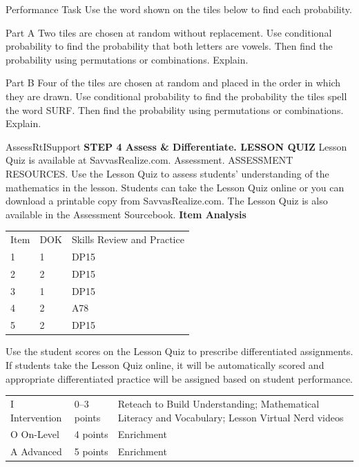 \documentclass{article}
\newenvironment{practice}[2]{}{}        %
\newenvironment{te-addendum}[2]{}{}     %
\newcommand{\answer}[1]{}               %
\newcommand{\placeholder}[2]{}          %
\begin{document}
\begin{practice}{36}{3}
Performance Task Use the word shown on the tiles below to find each probability.
\placeholder{diagram}{Nine equal red rectangular tiles with black outlines, white letters S U R F B O A R D in a horizontal row.}
Part A Two tiles are chosen at random without replacement. Use conditional probability to find the probability that both letters are vowels. Then find the probability using permutations or combinations. Explain.
\answer{Part A (P(V1\text{ and }V2)=P(V1)\cdot P(V2\mid V1)=\frac39\cdot\frac28=\frac1{12}); (P(V1\text{ and }V2)=\frac{{}_3C_2}{{}_9C_2}=\frac1{12})}
Part B Four of the tiles are chosen at random and placed in the order in which they are drawn. Use conditional probability to find the probability the tiles spell the word SURF. Then find the probability using permutations or combinations. Explain.
\answer{Part B (P(SURF)=\frac19\cdot\frac18\cdot\frac27\cdot\frac16=\frac1{1,512}); (P(SURF)=\frac{{}_1P_1\cdot{}_1P_1\cdot{}_2P_1\cdot{}_1P_1}{{}_9P_4}=\frac2{3,024}=\frac1{1,512})}
\end{practice}
\begin{te-addendum}{Assess}{RtISupport}
\textbf{STEP 4 Assess \& Differentiate. LESSON QUIZ}
Lesson Quiz is available at SavvasRealize.com. Assessment. ASSESSMENT RESOURCES.
Use the Lesson Quiz to assess students' understanding of the mathematics in the lesson.
Students can take the Lesson Quiz online or you can download a printable copy from SavvasRealize.com. The Lesson Quiz is also available in the Assessment Sourcebook.
\textbf{Item Analysis}
\begin{tabular}{lll}
Item & DOK & Skills Review and Practice \\
1 & 1 & DP15 \\
2 & 2 & DP15 \\
3 & 1 & DP15 \\
4 & 2 & A78 \\
5 & 2 & DP15 \\
\end{tabular}
Use the student scores on the Lesson Quiz to prescribe differentiated assignments.
If students take the Lesson Quiz online, it will be automatically scored and appropriate differentiated practice will be assigned based on student performance.
\begin{tabular}{lll}
I Intervention & 0--3 points & Reteach to Build Understanding; Mathematical Literacy and Vocabulary; Lesson Virtual Nerd videos \\
O On-Level & 4 points & Enrichment \\
A Advanced & 5 points & Enrichment \\
\end{tabular}
\end{te-addendum}
\end{document}
